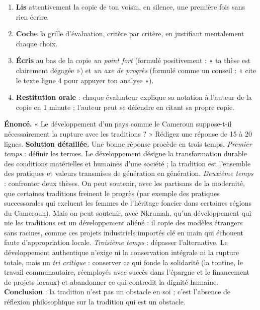 \documentclass[11pt]{article}
\begin{document}
\begin{methode}
\begin{enumerate}
\item \textbf{Lis} attentivement la copie de ton voisin, en silence, une première fois sans rien écrire.
\item \textbf{Coche} la grille d'évaluation, critère par critère, en justifiant mentalement chaque choix.
\item \textbf{Écris} au bas de la copie \emph{un point fort} (formulé positivement : « ta thèse est clairement dégagée ») et \emph{un axe de progrès} (formulé comme un conseil : « cite le texte ligne 4 pour appuyer ton analyse »).
\item \textbf{Restitution orale} : chaque évaluateur explique sa notation à l'auteur de la copie en 1 minute ; l'auteur peut se défendre en citant sa propre copie.
\end{enumerate}
\end{methode}

\begin{exoresolu}
\textbf{Énoncé.} « Le développement d'un pays comme le Cameroun suppose-t-il nécessairement la rupture avec les traditions ? » Rédigez une réponse de 15 à 20 lignes.
\tcblower
\textbf{Solution détaillée.} Une bonne réponse procède en trois temps. \emph{Premier temps} : définir les termes. Le développement désigne la transformation durable des conditions matérielles et humaines d'une société ; la tradition est l'ensemble des pratiques et valeurs transmises de génération en génération. \emph{Deuxième temps} : confronter deux thèses. On peut soutenir, avec les partisans de la modernité, que certaines traditions freinent le progrès (par exemple des pratiques successorales qui excluent les femmes de l'héritage foncier dans certaines régions du Cameroun). Mais on peut soutenir, avec Nkrumah, qu'un développement qui nie les traditions est un développement aliéné : il copie des modèles étrangers sans racines, comme ces projets industriels importés clé en main qui échouent faute d'appropriation locale. \emph{Troisième temps} : dépasser l'alternative. Le développement authentique n'exige ni la conservation intégrale ni la rupture totale, mais un \emph{tri critique} : conserver ce qui fonde la solidarité (la tontine, le travail communautaire, réemployés avec succès dans l'épargne et le financement de projets locaux) et abandonner ce qui contredit la dignité humaine. \textbf{Conclusion} : la tradition n'est pas un obstacle en soi ; c'est l'absence de réflexion philosophique sur la tradition qui est un obstacle.
\end{exoresolu}
\end{document}
